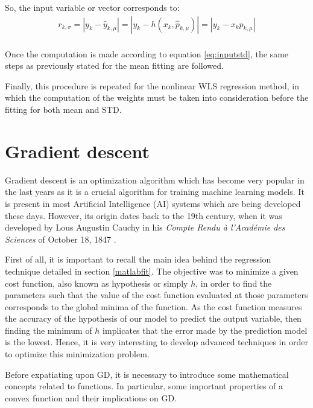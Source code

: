 \documentclass[a4paper, report, oneside, UKenglish]{memoir}
\begin{document}
So, the input variable or vector corresponds to:
\begin{equation}\label{eq:inputstd}
\begin{split}
    r_{k,\sigma} = |y_k - \hat{y}_{k,\mu}| = |y_k - h(x_{k},\hat{p}_{k,\mu})| = |y_k - x_{k}p_{k,\mu}|\\
\end{split}
\end{equation}

Once the computation is made according to equation \eqref{eq:inputstd}, the same steps as previously stated for the mean fitting are followed. 

Finally, this procedure is repeated for the nonlinear WLS regression method, in which the computation of the weights must be taken into consideration before the fitting for both mean and STD. 


\section{Gradient descent}

Gradient descent is an optimization algorithm which has become very popular in the last years as it is a crucial algorithm for training machine learning models. It is present in most Artificial Intelligence (AI) systems which are being developed these days. However, its origin dates back to the 19th century, when it was developed by Lous Augustin Cauchy in his \textit{Compte Rendu à l’Académie des Sciences} of October 18, 1847 \cite{cauchy}.

First of all, it is important to recall the main idea behind the regression technique detailed in section \ref{matlabfit}. The objective was to minimize a given cost function, also known as hypothesis or simply $h$, in order to find the parameters such that the value of the cost function evaluated at those parameters corresponds to the global minima of the function. As the cost function measures the accuracy of the hypothesis of our model to predict the output variable, then finding the minimum of $h$ implicates that the error made by the prediction model is the lowest. Hence, it is very interesting to develop advanced techniques in order to optimize this minimization problem. 

Before expatiating upon GD, it is necessary to introduce some mathematical concepts related to functions. In particular, some important properties of a convex function and their implications on GD. 
\end{document}
